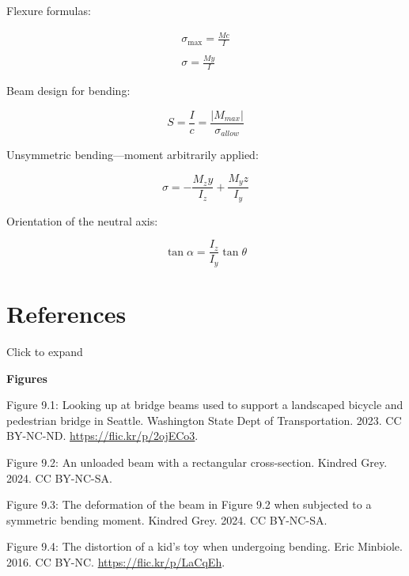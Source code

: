 \documentclass[
  letterpaper,
  DIV=11,
  numbers=noendperiod]{scrreprt}
\theoremstyle{definition}
\theoremstyle{remark}
\begin{document}
\begin{tcolorbox}[enhanced jigsaw, leftrule=.75mm, bottomrule=.15mm, opacityback=0, opacitybacktitle=0.6, colframe=quarto-callout-note-color-frame, toprule=.15mm, colbacktitle=quarto-callout-note-color!10!white, coltitle=black, bottomtitle=1mm, title={Key equations}, titlerule=0mm, toptitle=1mm, colback=white, rightrule=.15mm, left=2mm, arc=.35mm, breakable]

Flexure formulas:\,

\[
\begin{gathered}
\sigma_{\max }=\frac{M c}{I} \\
\\
\sigma=\frac{M y}{I}
\end{gathered}
\]

Beam design for bending:

\[
S=\frac{I}{c}=\frac{\left|M_{max}\right|}{\sigma_{allow}}
\]

Unsymmetric bending---moment arbitrarily applied:

\[
\sigma=-\frac{M_z y}{I_z}+\frac{M_y z}{I_y}
\]

Orientation of the neutral axis:

\[
\tan \alpha=\frac{I_z}{I_y} \tan \theta
\]

\end{tcolorbox}

\section*{References}\label{references-8}


Click to expand

\textbf{Figures}

Figure 9.1: Looking up at bridge beams used to support a landscaped
bicycle and pedestrian bridge in Seattle. Washington State Dept of
Transportation. 2023. CC BY-NC-ND. \url{https://flic.kr/p/2ojECo3}.

Figure 9.2: An unloaded beam with a rectangular cross-section. Kindred
Grey. 2024. CC BY-NC-SA.

Figure 9.3: The deformation of the beam in Figure 9.2 when subjected to
a symmetric bending moment. Kindred Grey. 2024. CC BY-NC-SA.

Figure 9.4: The distortion of a kid's toy when undergoing bending. Eric
Minbiole. 2016. CC BY-NC. \url{https://flic.kr/p/LaCqEh}.
\end{document}
